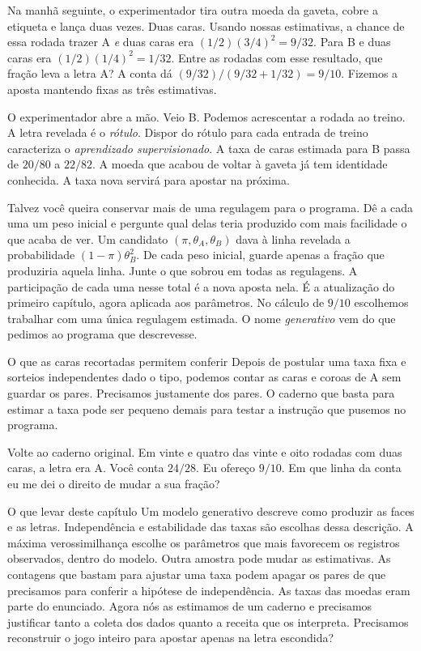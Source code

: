 Na manhã seguinte, o experimentador tira outra moeda da gaveta, cobre a etiqueta e lança duas vezes. Duas caras. Usando nossas estimativas, a chance de essa rodada trazer A \emph{e} duas caras era $(1/2)(3/4)^2=9/32$. Para B e duas caras era $(1/2)(1/4)^2=1/32$. Entre as rodadas com esse resultado, que fração leva a letra A? A conta dá $(9/32)/(9/32+1/32)=9/10$. Fizemos a aposta mantendo fixas as três estimativas.

O experimentador abre a mão. Veio B. Podemos acrescentar a rodada ao treino. A letra revelada é o \emph{rótulo}. Dispor do rótulo para cada entrada de treino caracteriza o \emph{aprendizado supervisionado}. A taxa de caras estimada para B passa de $20/80$ a $22/82$. A moeda que acabou de voltar à gaveta já tem identidade conhecida. A taxa nova servirá para apostar na próxima.

Talvez você queira conservar mais de uma regulagem para o programa. Dê a cada uma um peso inicial e pergunte qual delas teria produzido com mais facilidade o que acaba de ver. Um candidato $(\pi,\theta_A,\theta_B)$ dava à linha revelada a probabilidade $(1-\pi)\theta_B^2$. De cada peso inicial, guarde apenas a fração que produziria aquela linha. Junte o que sobrou em todas as regulagens. A participação de cada uma nesse total é a nova aposta nela. É a atualização do primeiro capítulo, agora aplicada aos parâmetros. No cálculo de $9/10$ escolhemos trabalhar com uma única regulagem estimada. O nome \emph{generativo} vem do que pedimos ao programa que descrevesse.

\begin{quadro}{O que as caras recortadas permitem conferir}
 Depois de postular uma taxa fixa e sorteios independentes dado o tipo, podemos contar as caras e coroas de A sem guardar os pares.
 Precisamos justamente dos pares. O caderno que basta para estimar a taxa pode ser pequeno demais para testar a instrução que pusemos no programa.
\end{quadro}

Volte ao caderno original. Em vinte e quatro das vinte e oito rodadas com duas caras, a letra era A. Você conta $24/28$. Eu ofereço $9/10$. Em que linha da conta eu me dei o direito de mudar a sua fração?

\begin{quadro}{O que levar deste capítulo}
 Um modelo generativo descreve como produzir as faces e as letras. Independência e estabilidade das taxas são escolhas dessa descrição.
 A máxima verossimilhança escolhe os parâmetros que mais favorecem os registros observados, dentro do modelo. Outra amostra pode mudar as estimativas.
 As contagens que bastam para ajustar uma taxa podem apagar os pares de que precisamos para conferir a hipótese de independência.
 As taxas das moedas eram parte do enunciado. Agora nós as estimamos de um caderno e precisamos justificar tanto a coleta dos dados quanto a receita que os interpreta.
 Precisamos reconstruir o jogo inteiro para apostar apenas na letra escondida?
\end{quadro}
